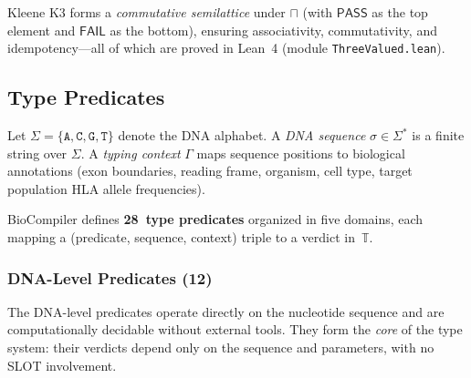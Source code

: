 \documentclass[acmsmall,review,anonymous]{acmart}
\newcommand{\PASS}{\ensuremath{\mathsf{PASS}}\xspace}
\newcommand{\FAIL}{\ensuremath{\mathsf{FAIL}}\xspace}
\newcommand{\tvl}{\mathbb{T}}
\newcommand{\seq}{\sigma}
\begin{document}
\noindent Kleene K3 forms a \emph{commutative semilattice} under
$\sqcap$ (with \PASS{} as the top element and \FAIL{} as the bottom),
ensuring associativity, commutativity, and idempotency---all of which
are proved in Lean~4 (module \texttt{ThreeValued.lean}).

\subsection{Type Predicates}\label{sec:predicates}

Let $\Sigma = \{\texttt{A}, \texttt{C}, \texttt{G}, \texttt{T}\}$
denote the DNA alphabet.
A \emph{DNA sequence} $\seq \in \Sigma^*$ is a finite string over
$\Sigma$.
A \emph{typing context} $\Gamma$ maps sequence positions to biological
annotations (exon boundaries, reading frame, organism, cell type,
target population HLA allele frequencies).

BioCompiler defines \textbf{28~type predicates} organized in five
domains, each mapping a (predicate, sequence, context) triple to a
verdict in~$\tvl$.

\subsubsection{DNA-Level Predicates (12)}

The DNA-level predicates operate directly on the nucleotide sequence
and are computationally decidable without external tools.
They form the \emph{core} of the type system: their verdicts depend
only on the sequence and parameters, with no SLOT involvement.
\end{document}
